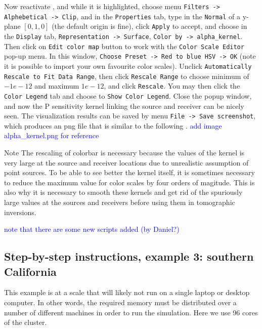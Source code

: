 \documentclass[10pt,fleqn,letterpaper]{article}
\newcommand{\blue}[1]{\textcolor{blue}{#1}}
\begin{document}
\begin{enumerate}
  Now reactivate , and while it is highlighted, choose menu \verb+Filters -> Alphebetical -> Clip+, and in the \verb+Properties+ tab, type in the \verb+Normal+ of a y-plane $[0,1,0]$ (the default origin is fine), click \verb+Apply+ to accept, and choose in the \verb+Display+ tab, \verb+Representation -> Surface+, \verb+Color by -> alpha_kernel+. Then click on \verb+Edit color map+ button to work with the \verb+Color Scale Editor+ pop-up menu. In this window, \verb+Choose Preset -> Red to blue HSV -> OK+ (note it is possible to import your own favourite color scales). Unclick \verb+Automatically Rescale to Fit Data Range+, then click \verb+Rescale Range+ to choose minimum of $-1e-12$ and maximum $1e-12$, and click \verb+Rescale+. You may then click the \verb+Color Legend+ tab and choose to \verb+Show Color Legend+. Close the popup window, and now the P sensitivity kernel linking the source and receiver can be nicely seen. The visualization results can be saved by menu \verb+File -> Save screenshot+, which produces an png file that is similar to the following .
\blue{add image alpha\_kernel.png for reference}
 
  Note The rescaling of colorbar is necessary because the values of the kernel is very large at the source and receiver locations due to unrealistic assumption of point sources. To be able to see better the kernel itself, it is sometimes necessary to reduce the maximum value for color scales by four orders of magitude. This is also why it is necessary to smooth these kernels and get rid of the spuriously large values at the sources and receivers before using them in tomographic inversions.
   

\end{enumerate}

\blue{note that there are some new scripts added (by Daniel?)}



\subsection*{Step-by-step instructions, example 3: southern California}

This example is at a scale that will likely not run on a single laptop or desktop computer. In other words, the required memory must be distributed over a number of different machines in order to run the simulation. Here we use 96 cores of the cluster.
\end{document}

